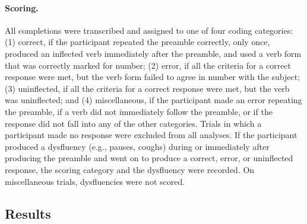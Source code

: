 \documentclass[12pt,titlepage]{article}
\begin{document}
\paragraph{Scoring.} All completions were transcribed and assigned to one
of four coding categories: (1) correct, if the participant repeated the
preamble correctly, only once, produced an inflected verb immediately after
the preamble, and used a verb form that was correctly marked for number;
(2) error, if all the criteria for a correct response were met, but the
verb form failed to agree in number with the subject; (3) uninflected, if
all the criteria for a correct response were met, but the verb was
uninflected; and (4) miscellaneous, if the participant made an error
repeating the preamble, if a verb did not immediately follow the preamble,
or if the response did not fall into any of the other categories.  Trials
in which a participant made no response were excluded from all analyses.
If the participant produced a dysfluency (e.g., pauses, coughs) during or
immediately after producing the preamble and went on to produce a correct,
error, or uninflected response, the scoring category and the dysfluency
were recorded.  On miscellaneous trials, dysfluencies were not scored.

\subsection{Results}
\end{document}
